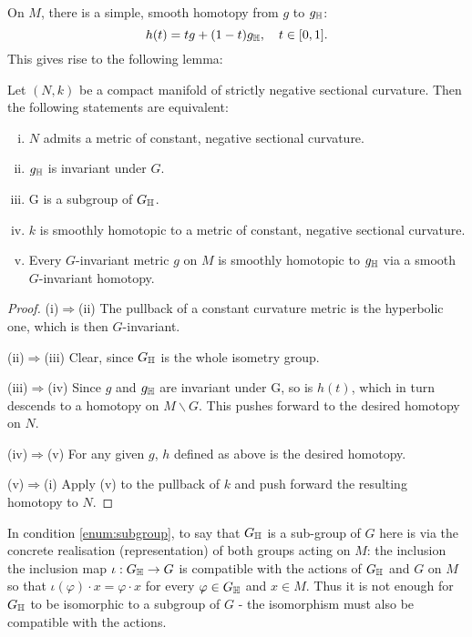 \documentclass[a4paper, 12pt]{amsart}
\begin{document}
On \(M\), there is a simple, smooth homotopy from \(g\) to \(g_{\mathbb{H}}\):
\[
h(t) = tg + (1-t)g_{\mathbb{H}}, \quad t \in [0, 1].
\]
This gives rise to the following lemma:

\begin{lemma}
\label{lem:const_neg}
Let \((N, k)\) be a compact manifold of strictly negative sectional curvature. Then the following statements are equivalent:
\begin{enumerate}[(i)]
\item \label{enum:neg_met} \(N\) admits a metric of constant, negative sectional curvature.
\item \label{enum:deck_met} \(g_{\mathbb{H}}\) is invariant under \(G\).
\item \label{enum:subgroup} G is a subgroup of \(G_{\mathbb{H}}\).
\item \label{enum:homo_met} \(k\) is smoothly homotopic to a metric of constant, negative sectional curvature.
\item \label{enum:homo_deck} Every \(G\)-invariant metric \(g\) on \(M\) is smoothly homotopic to \(g_{\mathbb{H}}\) via a smooth \(G\)-invariant homotopy.
\end{enumerate}
\end{lemma}

\begin{proof}




(i)\(\Rightarrow\)(ii)
The pullback of a constant curvature metric is the hyperbolic one, which is then \(G\)-invariant.

(ii)\(\Rightarrow\)(iii)
Clear, since \(G_{\mathbb{H}}\) is the whole isometry group.

(iii)\(\Rightarrow\)(iv)
Since \(g\) and \(g_{\mathbb{H}}\) are invariant under G, so is \(h(t)\), which in turn descends to a homotopy on \(M\backslash G\). This pushes forward to the desired homotopy on \(N\).

(iv)\(\Rightarrow\)(v)
For any given \(g\), \(h\) defined as above is the desired homotopy.

(v)\(\Rightarrow\)(i)
Apply (v) to the pullback of \(k\) and push forward the resulting homotopy to \(N\).


\end{proof}

\begin{rem}
In condition \ref{enum:subgroup}, to say that \(G_{\mathbb{H}}\) is a sub-group of \(G\) here is via the concrete realisation (representation) of both groups acting on \(M\): the inclusion the inclusion map \(\iota : G_{\mathbb{H}} \to G\) is compatible with the actions of \(G_{\mathbb{H}}\) and \(G\) on \(M\) so that \(\iota(\varphi) \cdot x = \varphi \cdot x\) for every \(\varphi \in G_{\mathbb{H}}\) and \(x \in M\). Thus it is not enough for \(G_{\mathbb{H}}\) to be isomorphic to a subgroup of \(G\) - the isomorphism must also be compatible with the actions.
\end{rem}
\end{document}
